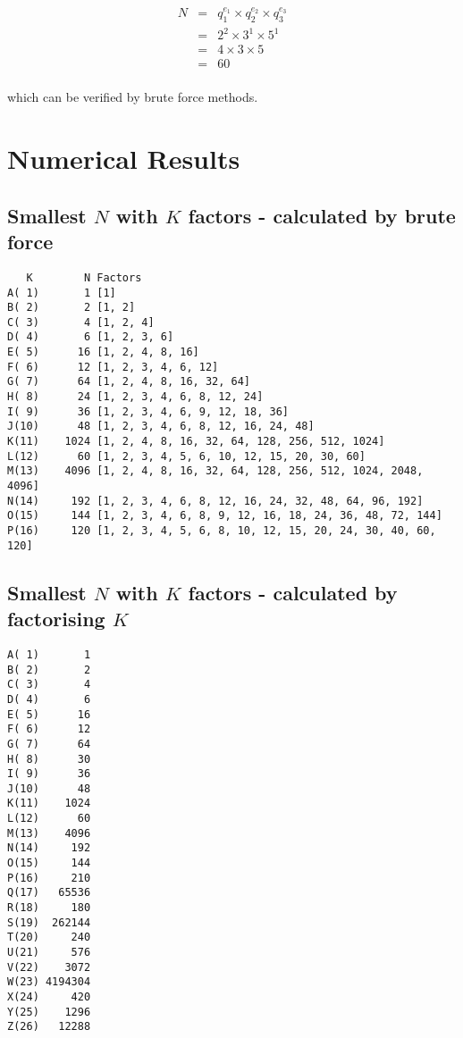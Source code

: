 \documentclass{article}
\begin{document}
\begin{eqnarray*}
N
& = & q_1 ^ {e_1} \times q_2 ^ {e_2} \times q_3 ^ {e_3} \\
& = & 2^2 \times 3^1 \times 5^1 \\
& = & 4 \times 3 \times 5 \\
& = & 60 \\
\end{eqnarray*}

which can be verified by brute force methods.

\pagebreak
\section*{Numerical Results}
\subsection*{Smallest $N$ with $K$ factors - calculated by brute force}
\begin{verbatim}
   K        N Factors
A( 1)       1 [1]
B( 2)       2 [1, 2]
C( 3)       4 [1, 2, 4]
D( 4)       6 [1, 2, 3, 6]
E( 5)      16 [1, 2, 4, 8, 16]
F( 6)      12 [1, 2, 3, 4, 6, 12]
G( 7)      64 [1, 2, 4, 8, 16, 32, 64]
H( 8)      24 [1, 2, 3, 4, 6, 8, 12, 24]
I( 9)      36 [1, 2, 3, 4, 6, 9, 12, 18, 36]
J(10)      48 [1, 2, 3, 4, 6, 8, 12, 16, 24, 48]
K(11)    1024 [1, 2, 4, 8, 16, 32, 64, 128, 256, 512, 1024]
L(12)      60 [1, 2, 3, 4, 5, 6, 10, 12, 15, 20, 30, 60]
M(13)    4096 [1, 2, 4, 8, 16, 32, 64, 128, 256, 512, 1024, 2048, 4096]
N(14)     192 [1, 2, 3, 4, 6, 8, 12, 16, 24, 32, 48, 64, 96, 192]
O(15)     144 [1, 2, 3, 4, 6, 8, 9, 12, 16, 18, 24, 36, 48, 72, 144]
P(16)     120 [1, 2, 3, 4, 5, 6, 8, 10, 12, 15, 20, 24, 30, 40, 60, 120]
\end{verbatim}

\subsection*{Smallest $N$ with $K$ factors - calculated by factorising $K$}

\begin{verbatim}
A( 1)       1
B( 2)       2
C( 3)       4
D( 4)       6
E( 5)      16
F( 6)      12
G( 7)      64
H( 8)      30
I( 9)      36
J(10)      48
K(11)    1024
L(12)      60
M(13)    4096
N(14)     192
O(15)     144
P(16)     210
Q(17)   65536
R(18)     180
S(19)  262144
T(20)     240
U(21)     576
V(22)    3072
W(23) 4194304
X(24)     420
Y(25)    1296
Z(26)   12288

\end{verbatim}
\end{document}
